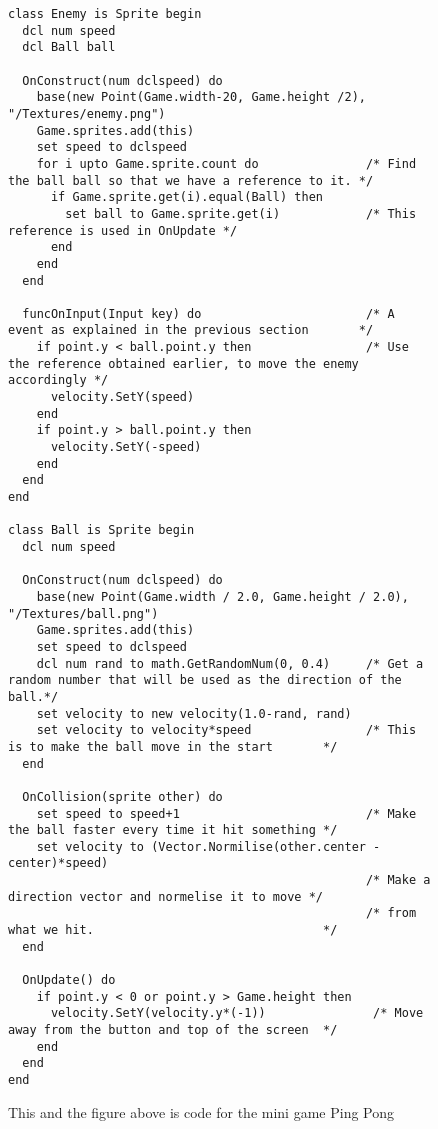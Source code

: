 \begin{figure}[H]
    \centering
    \begin{lstlisting}[style=gglang]
class Enemy is Sprite begin
  dcl num speed
  dcl Ball ball

  OnConstruct(num dclspeed) do
    base(new Point(Game.width-20, Game.height /2), "/Textures/enemy.png")
    Game.sprites.add(this)
    set speed to dclspeed
    for i upto Game.sprite.count do               /* Find the ball ball so that we have a reference to it. */
      if Game.sprite.get(i).equal(Ball) then
        set ball to Game.sprite.get(i)            /* This reference is used in OnUpdate */
      end
    end
  end

  funcOnInput(Input key) do                       /* A event as explained in the previous section       */
    if point.y < ball.point.y then                /* Use the reference obtained earlier, to move the enemy accordingly */
      velocity.SetY(speed)
    end
    if point.y > ball.point.y then
      velocity.SetY(-speed)
    end
  end
end

class Ball is Sprite begin
  dcl num speed

  OnConstruct(num dclspeed) do
    base(new Point(Game.width / 2.0, Game.height / 2.0), "/Textures/ball.png")
    Game.sprites.add(this)
    set speed to dclspeed
    dcl num rand to math.GetRandomNum(0, 0.4)     /* Get a random number that will be used as the direction of the ball.*/      
    set velocity to new velocity(1.0-rand, rand)
    set velocity to velocity*speed                /* This is to make the ball move in the start       */           
  end

  OnCollision(sprite other) do
    set speed to speed+1                          /* Make the ball faster every time it hit something */                   
    set velocity to (Vector.Normilise(other.center - center)*speed) 
                                                  /* Make a direction vector and normelise it to move */
                                                  /* from what we hit.                                */
  end

  OnUpdate() do
    if point.y < 0 or point.y > Game.height then 
      velocity.SetY(velocity.y*(-1))               /* Move away from the button and top of the screen  */   
    end
  end
end
    \end{lstlisting}
    \caption{This and the figure above is code for the mini game Ping Pong \label{code:minigame}}
\end{figure}


